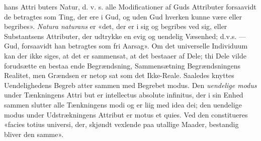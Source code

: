 \documentclass[12pt,a4paper]{book}
\begin{document}
%
hans Attri\-%
buters Natur, d. v. s. alle Modificationer af Guds Attributer
forsaavidt de betragtes som Ting, der ere i Gud, og uden Gud
hverken kunne være eller begribes». \emph{Natura naturans} er
«det, der er i sig og begribes ved sig, eller Substantsens
Attributer, der udtrykke en evig og uendelig Væsenhed; d.v.s.
--- Gud, forsaavidt han betragtes som fri Aarsag». Om det
universelle Individuum kan der ikke siges, at det er sammensat,
at det bestaaer af Dele; thi Dele vilde forudsætte en bestaa\-%
ende Begrændsning, Sammensætning Begrændsningens Realitet,
men Grændsen er netop sat som det Ikke-Reale. Saaledes
knyttes Uendelighedens Begreb atter sammen med Begrebet
modus. Den \emph{uendelige modus} under Tænkningens Attri\-%
but er intellectus absolute infinitus, der i sin Enhed sammen\-%
slutter alle Tænkningens modi og er liig med idea dei; den
uendelige modus under Udstrækningens Attribut er motus et
quies. Ved den constitueres «facies totius universi, der, skjøndt
vexlende paa utallige Maader, bestandig bliver den samme».
\end{document}
